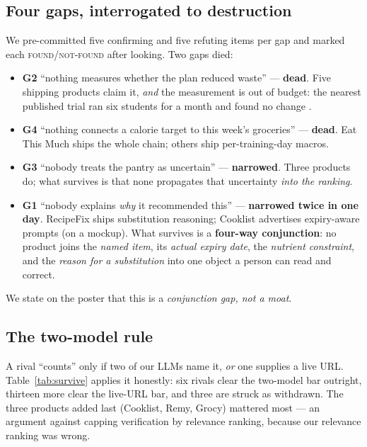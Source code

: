 \documentclass[sigconf,nonacm]{acmart}
\begin{document}
\subsection{Four gaps, interrogated to destruction}
We pre-committed five confirming and five refuting items per gap and marked each
\textsc{found}/\textsc{not-found} after looking. Two gaps died:
\begin{itemize}[leftmargin=1.2em]
\item \textbf{G2} ``nothing measures whether the plan reduced waste'' --- \textbf{dead}. Five shipping products claim it, \emph{and} the measurement is out of budget: the nearest published trial ran six students for a month and found no change \cite{jmir2022}.
\item \textbf{G4} ``nothing connects a calorie target to this week's groceries'' --- \textbf{dead}. Eat This Much ships the whole chain; others ship per-training-day macros.
\item \textbf{G3} ``nobody treats the pantry as uncertain'' --- \textbf{narrowed}. Three products do; what survives is that none propagates that uncertainty \emph{into the ranking}.
\item \textbf{G1} ``nobody explains \emph{why} it recommended this'' --- \textbf{narrowed twice in one day}. RecipeFix ships substitution reasoning; Cooklist advertises expiry-aware prompts (on a mockup). What survives is a \textbf{four-way conjunction}: no product joins the \emph{named item}, its \emph{actual expiry date}, the \emph{nutrient constraint}, and the \emph{reason for a substitution} into one object a person can read and correct.
\end{itemize}
We state on the poster that this is a \emph{conjunction gap, not a moat}.

\subsection{The two-model rule}
A rival ``counts'' only if two of our LLMs name it, \emph{or} one supplies a live
URL. Table~\ref{tab:survive} applies it honestly: six rivals clear the two-model
bar outright, thirteen more clear the live-URL bar, and three are struck as
withdrawn. The three products added last (Cooklist, Remy, Grocy) mattered most ---
an argument against capping verification by relevance ranking, because our
relevance ranking was wrong.
\end{document}
